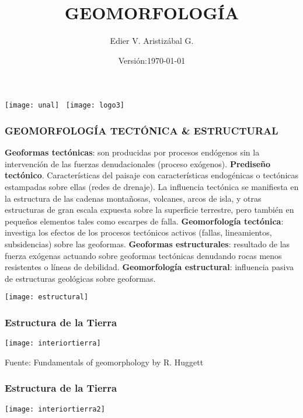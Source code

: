 \documentclass{beamer}
\title[Morfotectónica]{GEOMORFOLOGÍA}
\author[Edier Aristizabal]{Edier V. Aristizábal G.}
\institute{evaristizabalg@unal.edu.co}
\date{Versión:\today}
\begin{document}
\begin{frame}
\titlepage
\centering
	\texttt{[image: unal]}\hspace*{4.75cm}~%
   	\texttt{[image: logo3]} 
\end{frame}
\begin{frame}
\frametitle{GEOMORFOLOGÍA TECTÓNICA \& ESTRUCTURAL}
\justifying
\small{
\textbf{Geoformas tectónicas}: son producidas por procesos endógenos sin la intervención de las fuerzas denudacionales (proceso exógenos).\vfill
\textbf{Prediseño tectónico}. Características del paisaje con características endogénicas o tectónicas estampadas sobre ellas (redes de drenaje).\vfill
La influencia tectónica se manifiesta en la estructura de las cadenas montañosas, volcanes, arcos de isla, y otras estructuras de gran escala expuesta sobre la superficie terrestre, pero también en pequeños elementos tales como escarpes de falla.\vfill
\textbf{Geomorfología tectónica}: investiga los efectos de los procesos tectónicos activos (fallas, lineamientos, subsidencias) sobre las geoformas.\vfill
\textbf{Geoformas estructurales}: resultado de las fuerza exógenas actuando sobre geoformas tectónicas denudando rocas menos resistentes o líneas de debilidad.\vfill
\textbf{Geomorfología estructural}: influencia pasiva de estructuras geológicas sobre geoformas.}\\
\begin{center}
\texttt{[image: estructural]}
\end{center}
\end{frame}
\begin{frame}
\frametitle{Estructura de la Tierra}
\begin{center}
\texttt{[image: interiortierra]}
\end{center}
\tiny{Fuente: Fundamentals of geomorphology by R. Huggett}
\end{frame}
\begin{frame}
\frametitle{Estructura de la Tierra}
\begin{center}
\texttt{[image: interiortierra2]}
\end{center}
\tiny{}
\end{frame}
\end{document}
